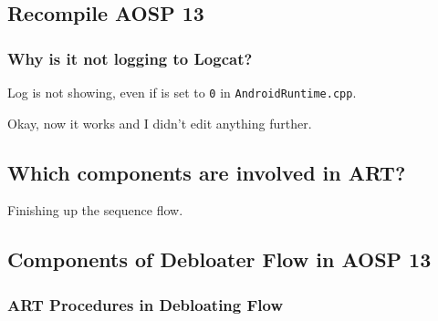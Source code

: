 \label{task:20240409_aosp}


\subsection{Recompile AOSP 13}

\subsubsection{Why is it not logging to Logcat?}

Log is not showing, even if  is set to \texttt{0} in \texttt{AndroidRuntime.cpp}.

Okay, now it works and I didn't edit anything further.

\subsection{Which components are involved in ART?}
Finishing up the sequence flow.

\subsection{Components of Debloater Flow in AOSP 13} 

\subsubsection{ART Procedures in Debloating Flow}

